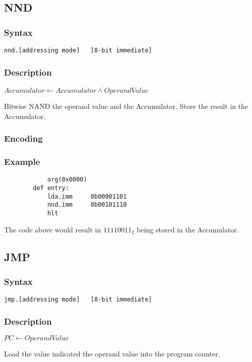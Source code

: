 \pagebreak
\subsection{NND}\label{subsec:nand}
    \subsubsection{Syntax}
    \begin{verbatim}nnd.[addressing mode]   [8-bit immediate] \end{verbatim}

    \subsubsection{Description}
    $Accumulator \leftarrow \overline{Accumulator \land OperandValue}$
    \par Bitwise NAND the operand value and the Accumulator.
    Store the result in the Accumulator.

    \subsubsection{Encoding}


    \subsubsection{Example}
    \begin{verbatim}
            org(0x0000)
        def entry:
            lda.imm     0b00001101
            nnd.imm     0b00101110
            hlt
    \end{verbatim}
    \par The code above would result in $11110011_{2}$ being stored in the Accumulator.

\pagebreak
\subsection{JMP}\label{subsec:jmp}
    \subsubsection{Syntax}
    \begin{verbatim}jmp.[addressing mode]   [8-bit immediate]\end{verbatim}
    \subsubsection{Description}
    $PC \leftarrow OperandValue$
    \par Load the value indicated the operand value into the program counter.
